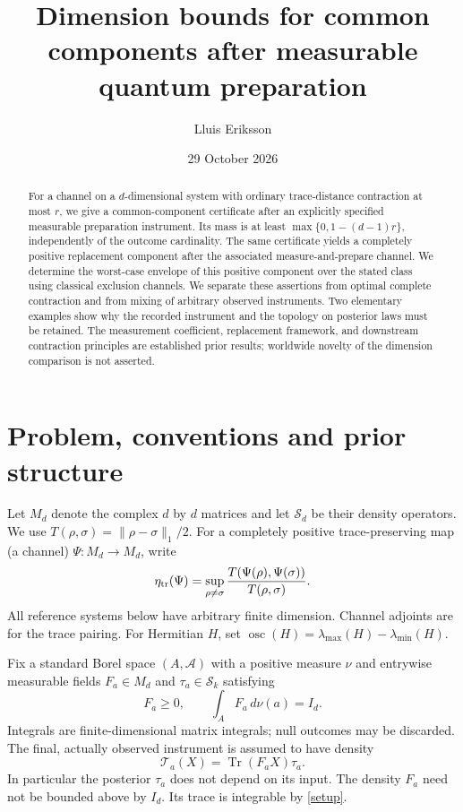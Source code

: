 \documentclass[11pt]{article}
\title{Dimension bounds for common components after measurable quantum preparation}
\author{Lluis Eriksson}
\date{29 October 2026}
\newcommand{\Tr}{\operatorname{Tr}}
\newcommand{\osc}{\operatorname{osc}}
\newcommand{\Sset}{\mathcal S}
\begin{document}
\maketitle
\begin{abstract}
For a channel on a $d$-dimensional system with ordinary trace-distance contraction at most $r$, we give a common-component certificate after an explicitly specified measurable preparation instrument. Its mass is at least $\max\{0,1-(d-1)r\}$, independently of the outcome cardinality. The same certificate yields a completely positive replacement component after the associated measure-and-prepare channel. We determine the worst-case envelope of this positive component over the stated class using classical exclusion channels. We separate these assertions from optimal complete contraction and from mixing of arbitrary observed instruments. Two elementary examples show why the recorded instrument and the topology on posterior laws must be retained. The measurement coefficient, replacement framework, and downstream contraction principles are established prior results; worldwide novelty of the dimension comparison is not asserted.
\end{abstract}

\section{Problem, conventions and prior structure}
Let $M_d$ denote the complex $d$ by $d$ matrices and let $\Sset_d$ be their density operators. We use $T(\rho,\sigma)=\|\rho-\sigma\|_1/2$. For a completely positive trace-preserving map (a channel) $\Psi:M_d\to M_d$, write
\[
 \eta_{\rm tr}(\Psi)=\sup_{\rho\ne\sigma}
 \frac{T(\Psi(\rho),\Psi(\sigma))}{T(\rho,\sigma)}.
\]
All reference systems below have arbitrary finite dimension. Channel adjoints are for the trace pairing. For Hermitian $H$, set
$\osc(H)=\lambda_{\max}(H)-\lambda_{\min}(H)$.

Fix a standard Borel space $(A,\mathcal A)$ with a positive measure $\nu$ and entrywise measurable fields $F_a\in M_d$ and $\tau_a\in \Sset_k$ satisfying
\begin{equation}\label{setup}
 F_a\ge0,\qquad \int_A F_a\,d\nu(a)=I_d .
\end{equation}
Integrals are finite-dimensional matrix integrals; null outcomes may be discarded. The final, actually observed instrument is assumed to have density
\begin{equation}\label{inst}
 \mathcal T_a(X)=\Tr(F_aX)\tau_a.
\end{equation}
In particular the posterior $\tau_a$ does not depend on its input. The density $F_a$ need not be bounded above by $I_d$. Its trace is integrable by \eqref{setup}.
\end{document}
